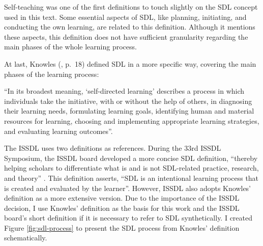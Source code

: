 Self-teaching was one of the first definitions to touch slightly on the \gls{SDL} concept used in this text. Some essential aspects of \gls{SDL}, like planning, initiating, and conducting the own learning, are related to this definition. Although it mentions these aspects, this definition does not have sufficient granularity regarding the main phases of the whole learning process.

At last, Knowles (\citeyear{knowles:1975}, p.~18) defined \gls{SDL} in a more specific way, covering the main phases of the learning process:
\begin{citacao}
    “In its broadest meaning, ‘self-directed learning’ describes a process in which individuals take the initiative, with or without the help of others, in diagnosing their learning needs, formulating learning goals, identifying human and material resources for learning, choosing and implementing appropriate learning strategies, and evaluating learning outcomes”.
\end{citacao}

The \gls{ISSDL} uses two definitions as references. During the 33rd \gls{ISSDL} Symposium, the \gls{ISSDL} board developed a more concise \gls{SDL} definition, “thereby helping scholars to differentiate what is and is not \gls{SDL}-related practice, research, and theory” \cite{issdl:2020}.  This definition asserts, “\gls{SDL} is an intentional learning process that is created and evaluated by the learner”. However, \gls{ISSDL} also adopts Knowles’ definition as a more extensive version. Due to the importance of the \gls{ISSDL} decision, I use Knowles’ definition as the basis for this work and the \gls{ISSDL} board’s short definition if it is necessary to refer to \gls{SDL} synthetically. I created Figure \ref{fig:sdl-process} to present the \gls{SDL} process from Knowles’ definition schematically.

